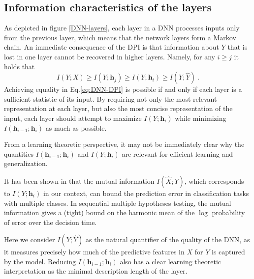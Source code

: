 \documentclass[11pt]{article}
\newcommand\mycomment[1]{} 			     %
\newcommand{\ignore}[1]{}
\begin{document}
{\subsection{Information characteristics of the layers}

As depicted in figure \ref{DNN-layers}, each layer in a DNN processes inputs
only from the previous layer, which means that the network layers form a Markov chain. 
An immediate consequence of  the DPI  is
that information about $Y$ that is lost in one layer cannot be recovered
in higher layers. Namely, for any $i\ge j$ it holds that 
\begin{equation}
I\left(Y;X\right)\ge I\left(Y;\mathbf{h}_{j}\right)\ge I\left(Y;\mathbf{h}_{i}\right)\ge I\left(Y;\hat{Y}\right)
\label{eq:DNN-DPI}~.
\end{equation}
Achieving equality
in Eq.\ref{eq:DNN-DPI} is possible if and only if each layer is a
sufficient statistic of its input.  By requiring not only the most relevant
representation at each layer, but also the most concise representation
of the input, each layer should attempt to maximize $I\left(Y;\mathbf{h}_{i}\right)$
while minimizing $I\left(\mathbf{h}_{i-1};\mathbf{h}_{i}\right)$
as much as possible.

From a learning theoretic perspective, it may not be immediately clear
why the quantities $I\left(\mathbf{h}_{i-1};\mathbf{h}_{i}\right)$
and $I\left(Y;\mathbf{h}_{i}\right)$ are relevant for efficient learning
and generalization. 
\ignore{In the case of binary classification, it is well known
that $I\left(Y;\mathbf{h}_{i}\right)$ is related to an upper bound
on the Bayesian prediction error (known as the Raviv-Hellman inequality
\mycomment{TODO - cite?}, namely the maximum a-posteriori error when trying
to predict $Y$ from $\mathbf{h}_{i}$. In addition,}
It has been shown in \cite{OS-SS-NT-2010} that the mutual information $I(\hat{X};Y)$,
which corresponds to $I\left(Y;\mathbf{h}_{i}\right)$ in our context,
can bound the prediction error in classification tasks with multiple classes.  
In sequential multiple hypotheses testing, the mutual information gives a (tight) bound  
on the harmonic mean of the $\log$ probability of error over the decision time.

Here we consider $I(Y;\hat{Y})$ as the natural quantifier of the quality of the DNN, as 
it measures precisely how much of the predictive features in $X$ for $Y$ is 
captured by the model. 
Reducing $I\left(\mathbf{h}_{i-1};\mathbf{h}_{i}\right)$
also has a clear learning theoretic interpretation as the minimal description
length of the layer. 

}
\end{document}
